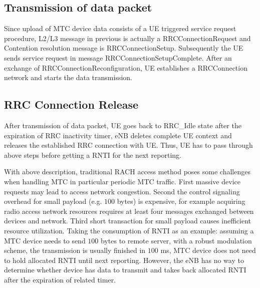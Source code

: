 \subsection{Transmission of data packet}
Since upload of MTC device data consists of a UE triggered service request procedure, L2/L3 message in previous is actually a RRCConnectionRequest and Contention resolution message is RRCConnectionSetup. Subsequently the UE sends service request in message RRCConnectionSetupComplete. After an exchange of RRCConnectionReconfiguration, UE establishes a RRCConnection network and starts the data transmission.
\subsection{RRC Connection Release}
After transmission of data packet, UE goes back to RRC\_Idle state after the expiration of RRC inactivity timer, eNB deletes complete UE context and releases the established RRC connection with UE. Thus, UE has to pass through above steps before getting a RNTI for the next reporting.

With above description, traditional RACH access method poses some challenges when handling MTC in particular periodic MTC traffic. First massive device requests may lead to access network congestion. Second the control signaling overhead for small payload (e.g. $100$ bytes) is expensive, for example acquiring radio access network resources requires at least four messages exchanged between devices and network. Third short transaction for small payload causes inefficient resource utilization. Taking the consumption of RNTI as an example: assuming a MTC device needs to send $100$ bytes to remote server,  with a robust modulation scheme, the transmission is usually finished in $100$ ms, MTC device does not need to hold allocated RNTI until next reporting. However, the eNB has no way to determine whether device has data to transmit and takes back allocated RNTI after the expiration of related timer. 
